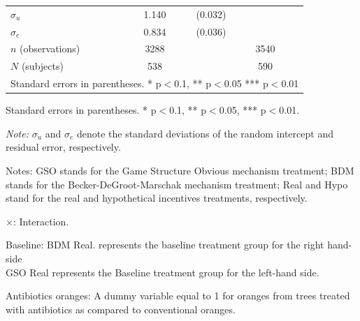 \documentclass[12pt]{article}
\newcommand{\sym}[1]{\rlap{$^{#1}$}}
\begin{document}
\begin{table}[H]
{\begin{tabular}{l*{2}{cc}}
$\sigma_u $    &       1.140\sym{***}&     (0.032)&                     &            \\
$\sigma_e $     &       0.834\sym{***}&     (0.036)&                     &            \\
\hline
\(n\) (observations)    &        3288         &            &        3540         &            \\
\(N\) (subjects)      &        538         &            &        590         &            \\
\hline \hline
\multicolumn{5}{l}{\footnotesize Standard errors in parentheses. * p$<$0.1, ** p$<$0.05 *** p$<$0.01}\\
\end{tabular}
}

\begin{tablenotes}
            \footnotesize
            \item Standard errors in parentheses. * p$<$0.1, ** p$<$0.05, *** p$<$0.01.
            \item \textit{Note:} $\sigma_u$ and $\sigma_e$ denote the standard deviations of the random intercept and residual error, respectively.
            \item Notes: GSO stands for the Game Structure Obvious mechanism treatment; BDM stands for the Becker-DeGroot-Marschak mechanism treatment; Real and Hypo stand for the real and hypothetical incentives treatments, respectively.
           \item $\times$: Interaction.
           \item Baseline: BDM Real. represents the baseline treatment group for the right hand-side \\
           GSO Real represents the Baseline treatment group for the left-hand side.
           \item Antibiotics oranges: A dummy variable equal to 1 for oranges from trees treated with antibiotics as compared to conventional oranges.
        \end{tablenotes}
\end{table}
\end{document}
